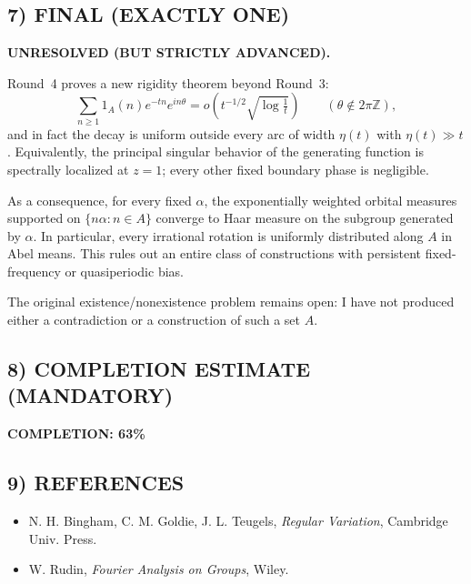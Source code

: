 \subsection*{7) FINAL (EXACTLY ONE)}
\textbf{UNRESOLVED (BUT STRICTLY ADVANCED).}

Round~4 proves a new rigidity theorem beyond Round~3:
\[
\sum_{n\ge1}1_A(n)e^{-tn}e^{in\theta}
=o\!\left(t^{-1/2}\sqrt{\log\tfrac1t}\right)
\qquad(\theta\notin2\pi\mathbb Z),
\]
and in fact the decay is uniform outside every arc of width $\eta(t)$ with $\eta(t)\gg t$.  Equivalently, the principal singular behavior of the generating function is spectrally localized at $z=1$; every other fixed boundary phase is negligible.

As a consequence, for every fixed $\alpha$, the exponentially weighted orbital measures supported on $\{n\alpha:n\in A\}$ converge to Haar measure on the subgroup generated by $\alpha$.  In particular, every irrational rotation is uniformly distributed along $A$ in Abel means.  This rules out an entire class of constructions with persistent fixed-frequency or quasiperiodic bias.

The original existence/nonexistence problem remains open: I have not produced either a contradiction or a construction of such a set $A$.

\subsection*{8) COMPLETION ESTIMATE (MANDATORY)}
\noindent\textbf{COMPLETION: 63\%}

\subsection*{9) REFERENCES}
\begin{itemize}
\item N. H. Bingham, C. M. Goldie, J. L. Teugels, \emph{Regular Variation}, Cambridge Univ. Press.
\item W. Rudin, \emph{Fourier Analysis on Groups}, Wiley.
\end{itemize}
